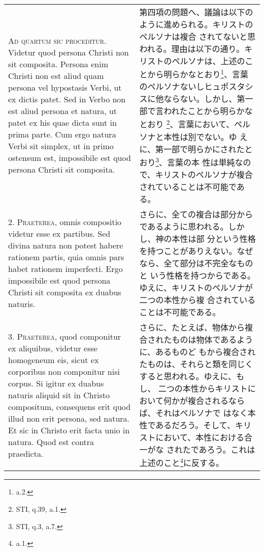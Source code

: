 \documentclass[10pt]{jsarticle} %
\begin{document}
\begin{longtable}{p{21em}p{21em}}

{\Huge A}{\scshape d quartum sic proceditur}. Videtur quod persona
Christi non sit composita. Persona enim Christi non est aliud quam
persona vel hypostasis Verbi, ut ex dictis patet. Sed in Verbo non est
aliud persona et natura, ut patet ex his quae dicta sunt in prima
parte. Cum ergo natura Verbi sit simplex, ut in primo ostensum est,
impossibile est quod persona Christi sit composita.


&

第四項の問題へ、議論は以下のように進められる。キリストのペルソナは複合
されてないと思われる。理由は以下の通り。キリストのペルソナは、上述のこ
とから明らかなとおり\footnote{a.2.}、言葉のペルソナないしヒュポスタシ
スに他ならない。しかし、第一部で言われたことから明らかなとおり
\footnote{STI, q.39, a.1.}、言葉において、ペルソナと本性は別でない。ゆ
えに、第一部で明らかにされたとおり\footnote{STI, q.3, a.7.}、言葉の本
性は単純なので、キリストのペルソナが複合されていることは不可能である。

\\



2. {\scshape Praeterea}, omnis compositio videtur esse ex
partibus. Sed divina natura non potest habere rationem partis, quia
omnis pars habet rationem imperfecti. Ergo impossibile est quod
persona Christi sit composita ex duabus naturis.


&

さらに、全ての複合は部分からであるように思われる。しかし、神の本性は部
分という性格を持つことがありえない。なぜなら、全て部分は不完全なものと
いう性格を持つからである。ゆえに、キリストのペルソナが二つの本性から複
合されていることは不可能である。

\\



3. {\scshape Praeterea}, quod componitur ex aliquibus, videtur esse
homogeneum eis, sicut ex corporibus non componitur nisi corpus. Si
igitur ex duabus naturis aliquid sit in Christo compositum, consequens
erit quod illud non erit persona, sed natura. Et sic in Christo erit
facta unio in natura. Quod est contra praedicta.


&


さらに、たとえば、物体から複合されたものは物体であるように、あるものど
もから複合されたものは、それらと類を同じくすると思われる。ゆえに、もし、
二つの本性からキリストにおいて何かが複合されるならば、それはペルソナで
はなく本性であるだろう。そして、キリストにおいて、本性における合一がな
されたであろう。これは上述のこと\footnote{a.1.}に反する。


\end{longtable}
\end{document}
